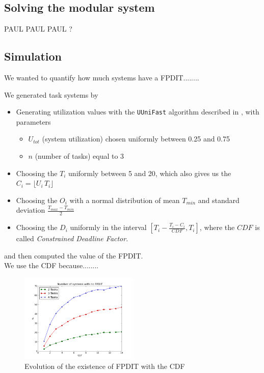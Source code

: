 \documentclass[times, 10pt,twocolumn, a4paper]{article}
\begin{document}
	\subsection{Solving the modular system}

	PAUL PAUL PAUL ?

	\subsection{Simulation}

	We wanted to quantify how much systems have a FPDIT........

	We generated task systems by
	\begin{itemize}
		\item Generating utilization values with the \texttt{UUniFast} algorithm described in \cite{bini2005measuring}, with parameters
		\begin{itemize}
			\item $U_{tot}$ (system utilization) chosen uniformly between 0.25 and 0.75
			\item $n$ (number of tasks) equal to 3
		\end{itemize}
		\item Choosing the $T_i$ uniformly between 5 and 20, which also gives us the $C_i = \lfloor U_i \, T_i \rfloor$
		\item Choosing the $O_i$ with a normal distribution of mean $T_{min}$ and standard deviation $\frac{T_{max} - T_{min}}{2}$
		\item Choosing the $D_i$ uniformly in the interval $[T_i - \frac{T_i - C_i}{CDF}, T_i]$, where the $CDF$ is called \emph{Constrained Deadline Factor}.
	\end{itemize}
	and then computed the value of the FPDIT.\\

	We use the CDF because........\\

	\begin{figure}[h]
	\begin{center}
		\includegraphics[width=0.5\textwidth]{python-simulation/plots/nofpdit.png}
	\end{center}
	\caption{Evolution of the existence of FPDIT with the CDF}
	\label{fig:noFPDIT}
	\end{figure}
\end{document}
